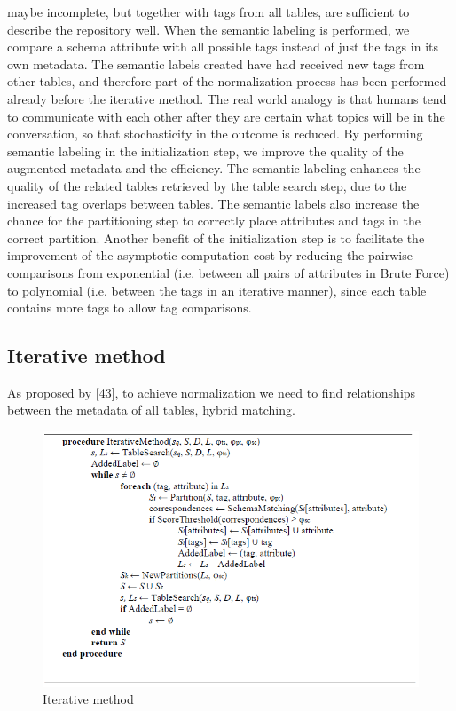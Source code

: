 maybe incomplete, but together with tags from all tables, are sufficient to describe the repository well. When the semantic labeling is performed, we compare a schema attribute with all possible tags instead of just the tags in its own metadata. The semantic labels created have had received new tags from other tables, and therefore part of the normalization process has been performed already before the iterative method. The real world analogy is that humans tend to communicate with each other after they are certain what topics will be in the conversation, so that stochasticity in the outcome is reduced.
By performing semantic labeling in the initialization step, we improve the quality of the augmented metadata and the efficiency. The semantic labeling enhances the quality of the related tables retrieved by the table search step, due to the increased tag overlaps between tables. The semantic labels also increase the chance for the partitioning step to correctly place attributes and tags in the correct partition. Another benefit of the initialization step is to facilitate the improvement of the asymptotic computation cost by reducing the pairwise comparisons from exponential (i.e. between all pairs of attributes in Brute Force) to polynomial (i.e. between the tags in an iterative manner), since each table contains more tags to allow tag comparisons.

\subsection{Iterative method}
\label{ssec:IterativeMethod}

As proposed by \cite{Smith2011Unity}[43], to achieve normalization we need to find relationships between the metadata of all tables, hybrid matching.

\begin{figure}
    \centering
    \includegraphics[width=5in]{figures/iterative-method.png}
    \caption{Iterative method}
    \label{fig:iterative-method}
\end{figure}

